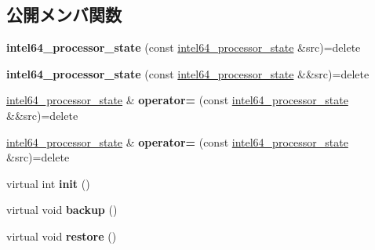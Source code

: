 \subsection*{公開メンバ関数}
\begin{DoxyCompactItemize}
\item 
\hypertarget{classintel64__processor__state_a3738e66d78d9a28faf9ac8add8f350ac}{}{\bfseries intel64\+\_\+processor\+\_\+state} (const \hyperlink{classintel64__processor__state}{intel64\+\_\+processor\+\_\+state} \&src)=delete\label{classintel64__processor__state_a3738e66d78d9a28faf9ac8add8f350ac}

\item 
\hypertarget{classintel64__processor__state_a963f64f0971ddae9de69ab273afef1d0}{}{\bfseries intel64\+\_\+processor\+\_\+state} (const \hyperlink{classintel64__processor__state}{intel64\+\_\+processor\+\_\+state} \&\&src)=delete\label{classintel64__processor__state_a963f64f0971ddae9de69ab273afef1d0}

\item 
\hypertarget{classintel64__processor__state_af4fe969204b5cebdce8674981ad8f993}{}\hyperlink{classintel64__processor__state}{intel64\+\_\+processor\+\_\+state} \& {\bfseries operator=} (const \hyperlink{classintel64__processor__state}{intel64\+\_\+processor\+\_\+state} \&\&src)=delete\label{classintel64__processor__state_af4fe969204b5cebdce8674981ad8f993}

\item 
\hypertarget{classintel64__processor__state_a32211085672078b47050e8376715676b}{}\hyperlink{classintel64__processor__state}{intel64\+\_\+processor\+\_\+state} \& {\bfseries operator=} (const \hyperlink{classintel64__processor__state}{intel64\+\_\+processor\+\_\+state} \&src)=delete\label{classintel64__processor__state_a32211085672078b47050e8376715676b}

\item 
\hypertarget{classintel64__processor__state_a860b0103e12ebd4b92ec57797d9aed8b}{}virtual int {\bfseries init} ()\label{classintel64__processor__state_a860b0103e12ebd4b92ec57797d9aed8b}

\item 
\hypertarget{classintel64__processor__state_a7a36494e44f9d20cc414b182b0175522}{}virtual void {\bfseries backup} ()\label{classintel64__processor__state_a7a36494e44f9d20cc414b182b0175522}

\item 
\hypertarget{classintel64__processor__state_a2d37a8ab375394e307ace448e0227de3}{}virtual void {\bfseries restore} ()\label{classintel64__processor__state_a2d37a8ab375394e307ace448e0227de3}


\end{DoxyCompactItemize}
